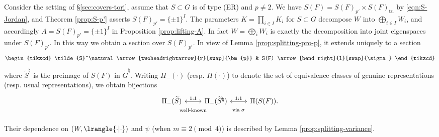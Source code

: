 \documentclass[a4paper,10pt]{article}
\begin{document}
\begin{example}\label{eg:section-S}
	Consider the setting of \S\ref{sec:covers-tori}, assume that $S \subset G$ is of type (ER) and $p \neq 2$. We have $S(F) = S(F)_{p'} \times S(F)_{\text{tu}}$ by \eqref{eqn:S-Jordan}, and Theorem \ref{prop:S-p'} asserts $S(F)_{p'} = \{\pm 1\}^I$. The parameters $K = \prod_{i \in I} K_i$ for $S \subset G$ decompose $W$ into $\bigoplus_{i \in I} W_i$, and accordingly $A = S(F)_{p'} = \{\pm 1\}^I$ in Proposition \ref{prop:lifting-A}. In fact $W = \bigoplus_i W_i$ is exactly the decomposition into joint eigenspaces under $S(F)_{p'}$. In this way we obtain a section over $S(F)_{p'}$. In view of Lemma \ref{prop:splitting-pro-p}, it extends uniquely to a section
	\[\begin{tikzcd}
		\tilde{S}^\natural \arrow[twoheadrightarrow]{r}[swap]{\bm{p}} & S(F) \arrow[bend right]{l}[swap]{\sigma}
	\end{tikzcd}\]
	where $\tilde{S}^\natural$ is the preimage of $S(F)$ in $\tilde{G}^\natural$. Writing $\Pi_-(\cdot)$ (resp. $\Pi(\cdot)$) to denote the set of equivalence classes of genuine representations (resp. usual representations), we obtain bijections
	\begin{equation}\label{eqn:splitting-genuine} \begin{tikzcd}
		\Pi_-(\widetilde{S}) \arrow[leftrightarrow]{r}{1:1}[swap, inner sep=1em]{\text{well-known}} & \Pi_-(\widetilde{S}^\natural) \arrow[leftrightarrow]{r}{1:1}[swap, inner sep=1em]{\text{via}\;\sigma} & \Pi(S(F)).
	\end{tikzcd}\end{equation}
	Their dependence on $(W, \lrangle{\cdot|\cdot})$ and $\psi$ (when $m \equiv 2 \pmod 4$) is described by Lemma \ref{prop:splitting-variance}.
\end{example}
\end{document}

